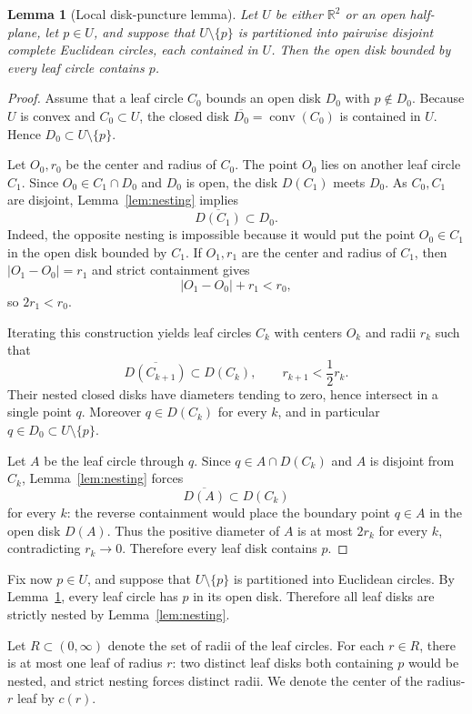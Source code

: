 \documentclass[11pt]{article}
\newtheorem{lemma}[theorem]{Lemma}
\newcommand{\R}{\mathbb{R}}
\newcommand{\ol}{\overline}
\begin{document}
\begin{lemma}[Local disk-puncture lemma]\label{lem:localpuncture}
Let $U$ be either $\R^2$ or an open half-plane, let $p\in U$, and suppose that $U\setminus\{p\}$ is partitioned into pairwise disjoint complete Euclidean circles, each contained in $U$. Then the open disk bounded by every leaf circle contains $p$.
\end{lemma}

\begin{proof}
Assume that a leaf circle $C_0$ bounds an open disk $D_0$ with $p\notin D_0$. Because $U$ is convex and $C_0\subset U$, the closed disk $\ol{D_0}=\operatorname{conv}(C_0)$ is contained in $U$. Hence $D_0\subset U\setminus\{p\}$.

Let $O_0,r_0$ be the center and radius of $C_0$. The point $O_0$ lies on another leaf circle $C_1$. Since $O_0\in C_1\cap D_0$ and $D_0$ is open, the disk $D(C_1)$ meets $D_0$. As $C_0,C_1$ are disjoint, Lemma~\ref{lem:nesting} implies
\[
\ol{D(C_1)}\subset D_0.
\]
Indeed, the opposite nesting is impossible because it would put the point $O_0\in C_1$ in the open disk bounded by $C_1$. If $O_1,r_1$ are the center and radius of $C_1$, then $|O_1-O_0|=r_1$ and strict containment gives
\[
|O_1-O_0|+r_1<r_0,
\]
so $2r_1<r_0$.

Iterating this construction yields leaf circles $C_k$ with centers $O_k$ and radii $r_k$ such that
\[
\ol{D(C_{k+1})}\subset D(C_k),
\qquad
r_{k+1}<\frac12r_k.
\]
Their nested closed disks have diameters tending to zero, hence intersect in a single point $q$. Moreover $q\in D(C_k)$ for every $k$, and in particular $q\in D_0\subset U\setminus\{p\}$.

Let $A$ be the leaf circle through $q$. Since $q\in A\cap D(C_k)$ and $A$ is disjoint from $C_k$, Lemma~\ref{lem:nesting} forces
\[
\ol{D(A)}\subset D(C_k)
\]
for every $k$: the reverse containment would place the boundary point $q\in A$ in the open disk $D(A)$. Thus the positive diameter of $A$ is at most $2r_k$ for every $k$, contradicting $r_k\to0$. Therefore every leaf disk contains $p$.
\end{proof}

Fix now $p\in U$, and suppose that $U\setminus\{p\}$ is partitioned into Euclidean circles. By Lemma~\ref{lem:localpuncture}, every leaf circle has $p$ in its open disk. Therefore all leaf disks are strictly nested by Lemma~\ref{lem:nesting}.

Let $R\subset(0,\infty)$ denote the set of radii of the leaf circles. For each $r\in R$, there is at most one leaf of radius $r$: two distinct leaf disks both containing $p$ would be nested, and strict nesting forces distinct radii. We denote the center of the radius-$r$ leaf by $c(r)$.
\end{document}
